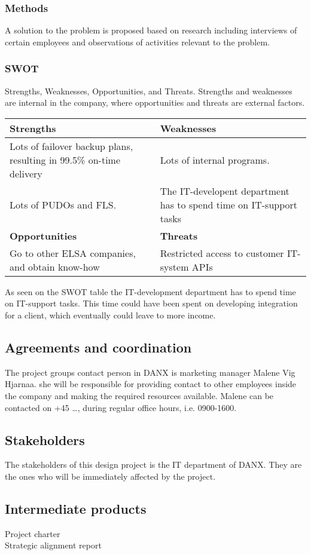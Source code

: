 \subsubsection{Methods}
A solution to the problem is proposed based on research including interviews of certain employees and observations of activities relevant to the problem.


\subsubsection{SWOT}
Strengths, Weaknesses, Opportunities, and Threats.
Strengths and weaknesses are internal in the company, where opportunities and threats are external factors.

\begin{table}[htdp]
\label{SWOT analysis}
\begin{tabular}{| p{} | p{} |}
\hline
\rowcolor{GR}
\textbf{Strengths} & \textbf{Weaknesses} \\ \hline \hline
Lots of failover backup plans, resulting in 99.5\% on-time delivery & Lots of internal programs.
\\ \hline
Lots of PUDOs and FLS. & The IT-developent department has to spend time on IT-support tasks \\ \hline \hline
\rowcolor{GR}
\textbf{Opportunities} & \textbf{Threats} \\ \hline
Go to other ELSA companies, and obtain know-how & Restricted access to customer IT-system APIs \\ \hline
\end{tabular}
\end{table}

As seen on the SWOT table the IT-development department has to spend time on IT-support tasks. This time could have been spent on developing integration for a client, which eventually could leave to more income.

\subsection{Agreements and coordination}
The project groups contact person in DANX is marketing manager Malene Vig Hjarnaa. she will be responsible for providing contact to other employees inside the company and making the required resources available. Malene can be contacted on +45 …, during regular office hours, i.e. 0900-1600.

\subsection{Stakeholders}
The stakeholders of this design project is the IT department of DANX. They are the ones who will be immediately affected by the project.

\subsection{Intermediate products}
\begin{description}
	\item[Project charter] 
	\item[Strategic alignment report] 
\end{description}